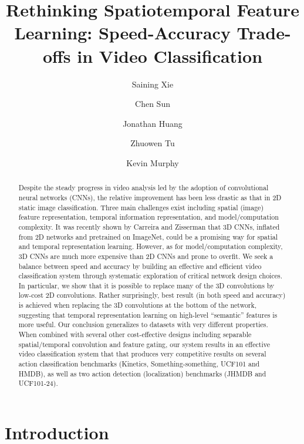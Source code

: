 \documentclass[runningheads]{llncs}
\begin{document}
\title{Rethinking Spatiotemporal Feature Learning: Speed-Accuracy Trade-offs in Video Classification}


\author{Saining Xie\and
Chen Sun \and
Jonathan Huang  \and
Zhuowen Tu  \and
Kevin Murphy  
}


\maketitle              

\begin{abstract}
Despite the steady progress in video analysis led by the adoption of convolutional neural networks (CNNs), the relative improvement has been less drastic as that in 2D static image classification. Three main challenges exist including spatial (image) feature representation, temporal information representation, and model/computation complexity. It was recently shown by Carreira and Zisserman that 3D CNNs, inflated from 2D networks and pretrained on ImageNet, could be a promising way for spatial and temporal representation learning. However, as for model/computation complexity, 3D CNNs are much more expensive than 2D CNNs and prone to overfit. We seek a balance between speed and accuracy by building an effective and efficient video classification system through systematic exploration of critical network design choices. 
In particular, we show that it is possible to replace many of the 3D convolutions by low-cost 2D convolutions. Rather surprisingly, best result (in both speed and accuracy) is achieved when replacing the 3D convolutions at the bottom of the network, suggesting that temporal representation learning on high-level ``semantic'' features is more useful. Our conclusion generalizes to datasets with very different properties. When combined with several other cost-effective designs including separable spatial/temporal convolution and feature gating, our system results in an effective video classification system that that produces very competitive results on several action classification benchmarks (Kinetics, Something-something, UCF101 and HMDB), as well as two action detection (localization) benchmarks (JHMDB and UCF101-24).
\end{abstract}


 \section{Introduction}
\end{document}
